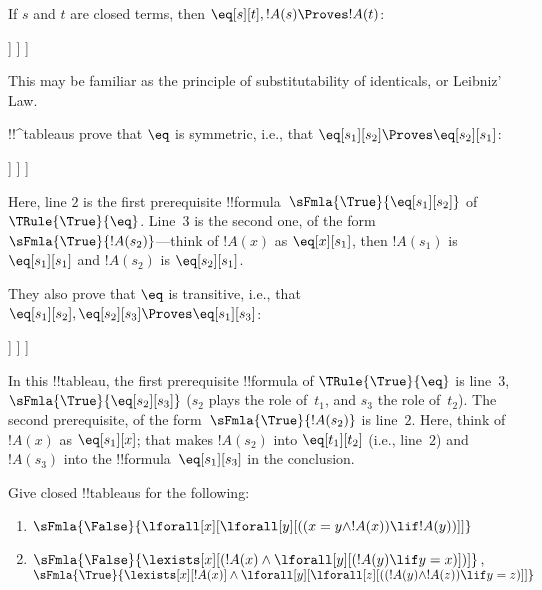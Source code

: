 \documentclass[../../../include/open-logic-section]{subfiles}
\begin{document}
\begin{ex}
If $s$ and $t$ are closed terms, then $\eq[s][t], !A(s)
\Proves !A(t)$:
\begin{oltableau}
  [\sFmla{\False}{\formula{A}(t)}, just = \TAss
    [\sFmla{\True}{\eq[s][t]}, just = \TAss
      [\sFmla{\True}{\formula{A}(s)}, just = \TAss
        [\sFmla{\True}{\formula{A}(t)}, just={\TRule{\True}{\eq}[2, 3]}, close]
      ]
    ]
  ]
\end{oltableau}
This may be familiar as the principle of substitutability of
identicals, or Leibniz' Law.

!!^{tableau}s prove that $\eq$ is symmetric, i.e., that $\eq[s_1][s_2]
\Proves \eq[s_2][s_1]$:
\begin{oltableau}
  [\sFmla{\False}{\eq[s_2][s_1]}, just = \TAss
    [\sFmla{\True}{\eq[s_1][s_2]}, just = \TAss
      [\sFmla{\True}{\eq[s_1][s_1]}, just = {$\eq$}
        [\sFmla{\True}{\eq[s_2][s_1]}, just = {\TRule{\True}{\eq}[2, 3]}, close]
      ]
    ]
  ]
\end{oltableau}
Here, line $2$ is the first prerequisite
!!{formula}~$\sFmla{\True}{\eq[s_1][s_2]}$ of $\TRule{\True}{\eq}$.
Line~$3$ is the second one, of the form $\sFmla{\True}{!A(s_2)}$---think of
$!A(x)$ as
$\eq[x][s_1]$, then $!A(s_1)$ is $\eq[s_1][s_1]$ and $!A(s_2)$ is $\eq[s_2][s_1]$.

They also prove that $\eq$ is transitive, i.e., that $\eq[s_1][s_2],
\eq[s_2][s_3] \Proves \eq[s_1][s_3]$:
\begin{oltableau}
  [\sFmla{\False}{\eq[s_1][s_3]}, just = \TAss
    [\sFmla{\True}{\eq[s_1][s_2]}, just = \TAss
      [\sFmla{\True}{\eq[s_2][s_3]}, just = \TAss
        [\sFmla{\True}{\eq[s_1][s_3]}, just = {\TRule{\True}{\eq}[3, 2]}, close]
      ]
    ]
  ]
\end{oltableau}
In this !!{tableau}, the first prerequisite !!{formula} of
$\TRule{\True}{\eq}$ is line~$3$, $\sFmla{\True}{\eq[s_2][s_3]}$
($s_2$ plays the role of~$t_1$, and $s_3$ the role of~$t_2$). The
second prerequisite, of the form~$\sFmla{\True}{!A(s_2)}$ is line~$2$.
Here, think of $!A(x)$ as $\eq[s_1][x]$; that makes $!A(s_2)$ into
$\eq[t_1][t_2]$ (i.e., line~$2$) and $!A(s_3)$ into the
!!{formula}~$\eq[s_1][s_3]$ in the conclusion.
\end{ex}

\begin{prob}
Give closed !!{tableau}s for the following:
\begin{enumerate}
\item $\sFmla{\False}{\lforall[x][\lforall[y][((x = y \land !A(x))
      \lif !A(y))]]}$
\item $\sFmla{\False}{\lexists[x][(!A(x) \land
    \lforall[y][(!A(y) \lif y = x)])]}$,\\
  $\sFmla{\True}{\lexists[x][!A(x)] \land
    \lforall[y][\lforall[z][((!A(y) \land !A(z)) \lif y = z)]]}$
\end{enumerate}
\end{prob}
\end{document}
